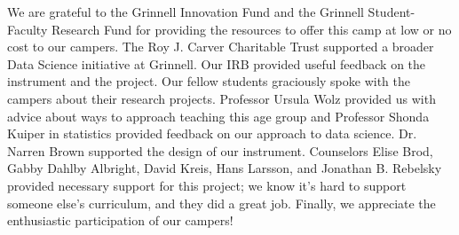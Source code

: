 \begin{acks}
\small
We are grateful to the Grinnell Innovation Fund and the Grinnell
Student-Faculty Research Fund for providing the resources to offer
this camp at low or no cost to our campers.  The Roy J. Carver
Charitable Trust supported a broader Data Science initiative at
Grinnell.  Our IRB provided
useful feedback on the instrument and the project.  Our fellow
students graciously spoke with the campers about their research
projects.  Professor Ursula Wolz provided us with advice about ways
to approach teaching this age group and Professor Shonda Kuiper in
statistics provided feedback on our approach to data science.  Dr.
Narren Brown supported the design of our instrument.
Counselors Elise Brod, Gabby Dahlby Albright, David
Kreis, Hans Larsson, and Jonathan B. Rebelsky provided necessary
support for this project; we know it's hard to support someone
else's curriculum, and they did a great job.  Finally, we appreciate
the enthusiastic participation of our campers!

\end{acks}
